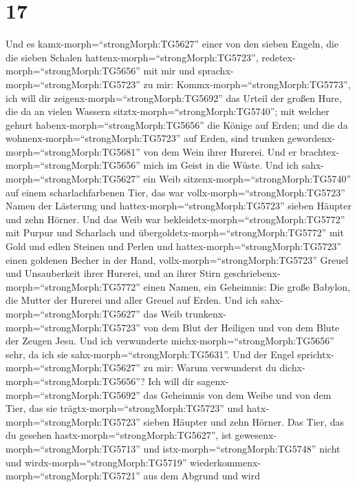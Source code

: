 \hypertarget{section-16}{%
\section{17}\label{section-16}}

 Und es kamx-morph=``strongMorph:TG5627'' einer von den
sieben Engeln, die die sieben Schalen
hattenx-morph=``strongMorph:TG5723'',
redetex-morph=``strongMorph:TG5656'' mit mir und
sprachx-morph=``strongMorph:TG5723'' zu mir:
Kommx-morph=``strongMorph:TG5773'', ich will dir
zeigenx-morph=``strongMorph:TG5692'' das Urteil der großen Hure, die da
an vielen Wassern sitztx-morph=``strongMorph:TG5740'';  mit
welcher gehurt habenx-morph=``strongMorph:TG5656'' die Könige auf Erden;
und die da wohnenx-morph=``strongMorph:TG5723'' auf Erden, sind trunken
gewordenx-morph=``strongMorph:TG5681'' von dem Wein ihrer Hurerei.
 Und er brachtex-morph=``strongMorph:TG5656'' mich im Geist
in die Wüste. Und ich sahx-morph=``strongMorph:TG5627'' ein Weib
sitzenx-morph=``strongMorph:TG5740'' auf einem scharlachfarbenen Tier,
das war vollx-morph=``strongMorph:TG5723'' Namen der Lästerung und
hattex-morph=``strongMorph:TG5723'' sieben Häupter und zehn Hörner.
 Und das Weib war bekleidetx-morph=``strongMorph:TG5772''
mit Purpur und Scharlach und übergoldetx-morph=``strongMorph:TG5772''
mit Gold und edlen Steinen und Perlen und
hattex-morph=``strongMorph:TG5723'' einen goldenen Becher in der Hand,
vollx-morph=``strongMorph:TG5723'' Greuel und Unsauberkeit ihrer
Hurerei,  und an ihrer Stirn
geschriebenx-morph=``strongMorph:TG5772'' einen Namen, ein Geheimnis:
Die große Babylon, die Mutter der Hurerei und aller Greuel auf Erden.
 Und ich sahx-morph=``strongMorph:TG5627'' das Weib
trunkenx-morph=``strongMorph:TG5723'' von dem Blut der Heiligen und von
dem Blute der Zeugen Jesu. Und ich verwunderte
michx-morph=``strongMorph:TG5656'' sehr, da ich sie
sahx-morph=``strongMorph:TG5631''.  Und der Engel
sprichtx-morph=``strongMorph:TG5627'' zu mir: Warum verwunderst du
dichx-morph=``strongMorph:TG5656''? Ich will dir
sagenx-morph=``strongMorph:TG5692'' das Geheimnis von dem Weibe und von
dem Tier, das sie trägtx-morph=``strongMorph:TG5723'' und
hatx-morph=``strongMorph:TG5723'' sieben Häupter und zehn Hörner.
 Das Tier, das du gesehen
hastx-morph=``strongMorph:TG5627'', ist
gewesenx-morph=``strongMorph:TG5713'' und
istx-morph=``strongMorph:TG5748'' nicht und
wirdx-morph=``strongMorph:TG5719''
wiederkommenx-morph=``strongMorph:TG5721'' aus dem Abgrund und wird

